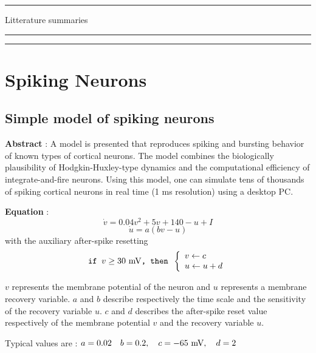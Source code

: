 \documentclass[12pt]{article}
\begin{document}
\thispagestyle{empty}
\hrule
\vspace{1em}
\begin{center}
{\Huge Litterature summaries} \\
\end{center}
\vspace{2em}
\hrule
\vspace{4em}

\tableofcontents
\vfill
\hrule
\newpage
\setcounter{page}{1}

\section{Spiking Neurons}

\subsection{Simple model of spiking neurons \cite{izhikevich2003simple}}
\textbf{Abstract} : A model is presented that reproduces spiking and bursting behavior of known types of cortical neurons. The model combines the biologically plausibility of Hodgkin-Huxley-type dynamics and the computational efficiency of integrate-and-fire neurons. Using this model, one can simulate tens of thousands of spiking cortical neurons in real time (1 ms resolution) using a desktop PC.

\textbf{Equation} : 
\begin{equation}
\dot{v} = 0.04 v^2 + 5 v + 140 - u + I
\end{equation}
\begin{equation}
\dot{u} = a(bv-u)
\end{equation}
with the auxiliary after-spike resetting \begin{equation}
\texttt{if } v \geq 30 \textnormal{ mV} \texttt{, then }
 \left\{
 \begin{array}{ll}
        v \leftarrow c \\
        u \leftarrow u + d
 \end{array} 
 \right.
\end{equation}

$v$ represents the membrane potential of the neuron and $u$ represents a membrane recovery variable. $a$ and $b$ describe respectively the time scale and the sensitivity of the recovery variable $u$. $c$ and $d$ describes the after-spike reset value respectively of the membrane potential $v$ and the recovery variable $u$.

Typical values are : $a=0.02 \quad b = 0.2, \quad c = -65 \textnormal{ mV}, \quad d=2$
\end{document}
